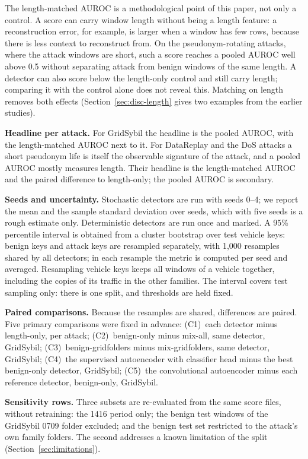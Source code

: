 The length-matched AUROC is a methodological point of this paper, not only a control. A score can carry
window length without being a length feature: a reconstruction error, for example, is larger when a window has
few rows, because there is less context to reconstruct from. On the pseudonym-rotating attacks, where the attack
windows are short, such a score reaches a pooled AUROC well above 0.5 without separating attack from benign
windows of the same length. A detector can also score below the length-only control and still carry length;
comparing it with the control alone does not reveal this. Matching on length removes both effects
(Section~\ref{sec:disc-length} gives two examples from the earlier studies).

\textbf{Headline per attack.} For GridSybil the headline is the pooled AUROC, with the length-matched AUROC next
to it. For DataReplay and the DoS attacks a short pseudonym life is itself the observable signature of the
attack, and a pooled AUROC mostly measures length. Their headline is the length-matched AUROC and the paired
difference to length-only; the pooled AUROC is secondary.

\textbf{Seeds and uncertainty.} Stochastic detectors are run with seeds 0--4; we report the mean and the sample
standard deviation over seeds, which with five seeds is a rough estimate only. Deterministic detectors are run
once and marked. A 95\% percentile interval is obtained from a cluster bootstrap over test vehicle keys: benign
keys and attack keys are resampled separately, with 1{,}000 resamples shared by all detectors; in each resample
the metric is computed per seed and averaged. Resampling vehicle keys keeps all windows of a vehicle together,
including the copies of its traffic in the other families. The interval covers test sampling only: there is one
split, and thresholds are held fixed.

\textbf{Paired comparisons.} Because the resamples are shared, differences are paired. Five primary comparisons
were fixed in advance: (C1)~each detector minus length-only, per attack; (C2)~benign-only minus mix-all, same
detector, GridSybil; (C3)~benign-gridfolders minus mix-gridfolders, same detector, GridSybil; (C4)~the supervised
autoencoder with classifier head minus the best benign-only detector, GridSybil; (C5)~the convolutional
autoencoder minus each reference detector, benign-only, GridSybil.

\textbf{Sensitivity rows.} Three subsets are re-evaluated from the same score files, without retraining: the
1416 period only; the benign test windows of the GridSybil 0709 folder excluded; and the benign test set
restricted to the attack's own family folders. The second addresses a known limitation of the split
(Section~\ref{sec:limitations}).

